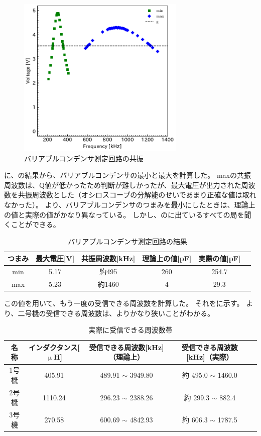 \documentclass[report.tex]{subfiles}
\begin{document}
\begin{figure}[H]
	\centering
	\includegraphics[width=8cm]{fig/min_max2.pdf}
	\caption{バリアブルコンデンサ測定回路の共振}
	\label{fig:inda5}
\end{figure}



に、の結果から、バリアブルコンデンサの最小と最大を計算した。
maxの共振周波数は、Q値が低かったため判断が難しかったが、最大電圧が出力された周波数を共振周波数とした（オシロスコープの分解能のせいであまり正確な値は取れなかった）。
より、バリアブルコンデンサのつまみを最小にしたときは、理論上の値と実際の値がかなり異なっている。
しかし、のに出ているすべての局を聞くことができる。

\begin{table}[H]
	\centering
	\caption{バリアブルコンデンサ測定回路の結果}
	\label{tab:ant3}
	\begin{tabular}{cccccc} \hline
		つまみ & 最大電圧[V] & 共振周波数[kHz] & 理論上の値[pF] & 実際の値[pF] \\ \hline
		min & 5.17    & 約495       & 260       & 254.7    \\
		max & 5.23    & 約1460      & 4         & 29.3     \\ \hline
	\end{tabular}
\end{table}

この値を用いて、もう一度の受信できる周波数を計算した。
それをに示す。
より、二号機の受信できる周波数は、よりかなり狭いことがわかる。

\begin{table}[H]
	\centering
	\caption{実際に受信できる周波数帯}
	\label{tab:ant5}
	\begin{tabular}{ccccc} \hline
		名称  & インダクタンス[\(\upmu\)H] & 受信できる周波数[kHz]（理論上）      & 受信できる周波数[kHz]（実際）       \\ \hline
		1号機 & 405.91              & 489.91 \(\sim\) 3949.80 & 約 495.0 \(\sim\) 1460.0 \\
		2号機 & 1110.24             & 296.23 \(\sim\) 2388.26 & 約 299.3 \(\sim\) 882.4  \\
		3号機 & 270.58              & 600.69 \(\sim\) 4842.93 & 約 606.3 \(\sim\) 1787.5 \\ \hline
	\end{tabular}
\end{table}
\end{document}
